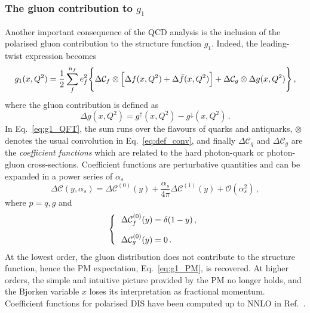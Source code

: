 \subsubsection*{The gluon contribution to $g_1$}
Another important consequence of the QCD analysis is the inclusion of the polarised gluon contribution to the structure function $g_1$. Indeed, the leading-twist expression becomes 
\begin{equation}
  g_1(x,Q^2) = \frac{1}{2} \sum_{f}^{n_f} e_{f}^2 \Biggl\{ \Delta \mathcal{C}_{f} \otimes \Bigl[ \Delta f (x,Q^2) + \Delta \bar{f} (x,Q^2) \Bigr] + \Delta \mathcal{C}_{g} \otimes \Delta g (x,Q^2)\Biggr\} \,,
  \label{eq:g1_QFT}
\end{equation}
where the gluon contribution is defined as
\begin{equation}
  \Delta g(x,Q^2) = g^{\uparrow}(x,Q^2) - g^{\downarrow}(x,Q^2) \,.
\end{equation}
In Eq.~\eqref{eq:g1_QFT}, the sum runs over the flavours of quarks and antiquarks, $\otimes$ denotes the usual convolution in Eq.~\eqref{eq:def_conv}, and finally $\Delta \mathcal{C}_{q}$ and $\Delta \mathcal{C}_{g}$ are the \textit{coefficient functions} which are related to the hard photon-quark or photon-gluon cross-sections. Coefficient functions are perturbative quantities and can be expanded in a power series of $\alpha_s$
\begin{equation}
  \Delta \mathcal{C} \left( y, \alpha_s \right) = \Delta \mathcal{C}^{(0)} (y) + \frac{\alpha_s}{4\pi} \Delta \mathcal{C}^{(1)} (y) + \mathcal{O}(\alpha_s^2)\,,
\end{equation}
where $p=q,g$ and
\begin{equation}
  \left\{ \hspace{-3mm}
  \begin{array}{cl}
    &\Delta \mathcal{C}_{f}^{(0)} (y) = \delta(1-y)\,,\\[10pt]
    &\Delta \mathcal{C}_{g}^{(0)} (y) = 0 \,.\\
  \end{array}
  \right.
\end{equation}
At the lowest order, the gluon distribution does not contribute to the structure function, hence the PM expectation, Eq.~\eqref{eq:g1_PM}, is recovered. At higher orders, the simple and intuitive picture provided by the PM no longer holds, and the Bjorken variable $x$ loses its interpretation as fractional momentum. Coefficient functions for polarised DIS have been computed up to NNLO in Ref.~\cite{Zijlstra:1993sh}.


